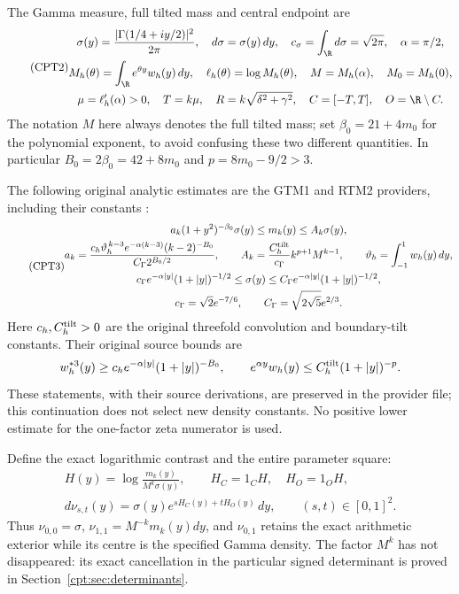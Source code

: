 \documentclass[11pt,a4paper]{article}
\begin{document}
The Gamma measure, full tilted mass and central endpoint are
\begin{equation}\tag{CPT2}
\begin{gathered}
 \sigma(y)=\frac{|\Gamma(1/4+iy/2)|^2}{2\pi},\quad
 d\sigma=\sigma(y)\,dy,\quad c_\sigma=\int_{\R}d\sigma=\sqrt{2\pi},
 \quad \alpha=\pi/2,\\
 M_h(\theta)=\int_{\R}e^{\theta y}w_h(y)\,dy,\quad
 \ell_h(\theta)=\log M_h(\theta),\quad
 M=M_h(\alpha),\quad M_0=M_h(0),\\
 \mu=\ell_h'(\alpha)>0,\quad T=k\mu,\quad
 R=k\sqrt{\delta^2+\gamma^2},\quad
 C=[-T,T],\quad O=\R\setminus C.
\end{gathered}
\end{equation}
The notation \(M\) here always denotes the full tilted mass; set
\(\beta_0=21+4m_0\) for the polynomial exponent, to avoid confusing
these two different quantities.  In particular \(B_0=2\beta_0=42+8m_0\)
and \(p=8m_0-9/2>3\).

The following original analytic estimates are the GTM1 and RTM2
providers, including their constants \cite{cpt:providers}:
\begin{equation}\tag{CPT3}
\begin{gathered}
 a_k(1+y^2)^{-\beta_0}\sigma(y)\le m_k(y)\le A_k\sigma(y),\\
 a_k=
 \frac{c_h\vartheta_h^{\,k-3}e^{-\alpha(k-3)}(k-2)^{-B_0}}
 {C_\Gamma2^{B_0/2}},\qquad
 A_k=\frac{C_h^{\rm tilt}}{c_\Gamma}k^{p+1}M^{k-1},
 \qquad \vartheta_h=\int_{-1}^1w_h(y)\,dy,\\
 c_\Gamma e^{-\alpha|y|}(1+|y|)^{-1/2}
 \le\sigma(y)\le
 C_\Gamma e^{-\alpha|y|}(1+|y|)^{-1/2},\\
 c_\Gamma=\sqrt2e^{-7/6},\qquad
 C_\Gamma=\sqrt{2\sqrt5}e^{2/3}.
\end{gathered}
\end{equation}
Here \(c_h,C_h^{\rm tilt}>0\) are the original threefold convolution
and boundary-tilt constants.  Their original source bounds are
\[
 w_h^{*3}(y)\ge c_h e^{-\alpha|y|}(1+|y|)^{-B_0},
 \qquad e^{\alpha y}w_h(y)\le
 C_h^{\rm tilt}(1+|y|)^{-p}.
\]
These statements, with their source derivations, are preserved in the
provider file; this continuation does not select new density constants.
No positive lower estimate for the one-factor zeta numerator is used.

Define the exact logarithmic contrast and the entire parameter square:
\begin{equation}\tag{CPT4}
\begin{gathered}
 H(y)=\log\frac{m_k(y)}{M^k\sigma(y)},\qquad
 H_C=1_CH,\quad H_O=1_OH,\\
 d\nu_{s,t}(y)=\sigma(y)e^{sH_C(y)+tH_O(y)}\,dy,
 \qquad (s,t)\in[0,1]^2.
\end{gathered}
\end{equation}
Thus \(\nu_{0,0}=\sigma\), \(\nu_{1,1}=M^{-k}m_k(y)dy\), and
\(\nu_{0,1}\) retains the exact arithmetic exterior while its centre is
the specified Gamma density.  The factor \(M^k\) has not disappeared:
its exact cancellation in the particular signed determinant is proved
in Section~\ref{cpt:sec:determinants}.
\end{document}
